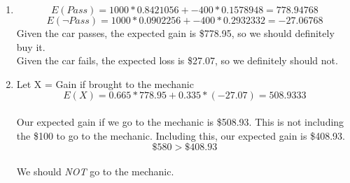 \documentclass[12pt,a4paper]{report}
\begin{document}
\begin{enumerate}
\begin{enumerate}
	\item
	\[E(Pass) = 1000*0.8421056 + -400*0.1578948 = 778.94768\]
	\[E(\neg Pass) = 1000*0.0902256 + -400*0.2932332 = -27.06768\]
	Given the car passes, the expected gain is \$778.95, so we should definitely buy it.\\
	Given the car fails, the expected loss is \$27.07, so we definitely should not.\\
	
	\item
	Let X = Gain if brought to the mechanic
	\[E(X) = 0.665*778.95 + 0.335*(-27.07) = 508.9333 \]\\
	Our expected gain if we go to the mechanic is \$508.93. This is not including the \$100 to go to the mechanic. Including this, our expected gain is \$408.93.
	\[ \$580 > \$408.93 \]\\
	We should \textit{NOT} go to the mechanic.\\
	
\end{enumerate}

\end{enumerate}
\end{document}
